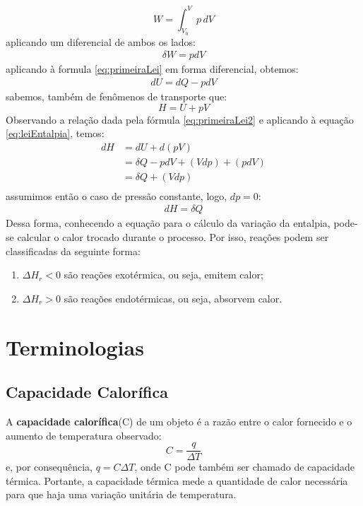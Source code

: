 \documentclass{article}
\begin{document}
\begin{equation}
  W=\int_{V_0}^{V} p\, dV  
\end{equation}
aplicando um diferencial de ambos os lados:
\begin{align*}
    \delta W=pdV
\end{align*}
aplicando à formula \ref{eq:primeiraLei} em forma diferencial, obtemos:
\begin{align}
    dU=dQ-pdV
  \label{eq:primeiraLei2}
\end{align}
sabemos, também de fenômenos de transporte que:
\begin{equation}
  H=U+pV
  \label{eq:leiEntalpia}
\end{equation}
Observando a relação dada pela fórmula \ref{eq:primeiraLei2} e aplicando à equação \ref{eq:leiEntalpia}, temos:
\begin{align*}
  dH&=dU + d(pV)\\
  &=\delta Q -pdV + (Vdp)+(pdV) \\
  &=\delta Q +(Vdp)\\
\end{align*}
assumimos então o caso de pressão constante, logo, $dp=0$:
\begin{align}
  dH=\delta Q 
\end{align}
Dessa forma, conhecendo a equação para o cálculo da variação da entalpia, pode-se calcular o calor trocado durante o processo. Por isso, reações podem ser classificadas da seguinte forma:
\begin{enumerate}
  \item $\Delta H_r < 0$ são reações exotérmica, ou seja, emitem calor;
  \item $\Delta H_r > 0$ são reações endotérmicas, ou seja, absorvem calor.
\end{enumerate}

\section{Terminologias}
\subsection{Capacidade Calorífica}
A \textbf{capacidade calorífica}(C) de um objeto é a razão entre o calor fornecido e o aumento de temperatura observado:
\begin{equation}
  C=\frac{q}{\Delta T}  
  \label{eq:eqCapCalorifica}
\end{equation}
e, por consequência, $q=C \Delta T$, onde C pode também ser chamado de capacidade térmica. Portante, a capacidade térmica mede a quantidade de calor necessária para que haja uma variação unitária de temperatura. 
\end{document}
